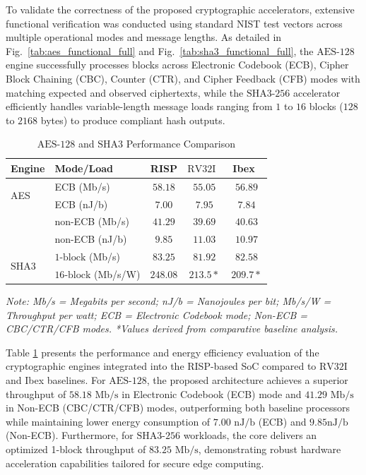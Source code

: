 To validate the correctness of the proposed cryptographic accelerators, extensive functional verification was conducted using standard NIST test vectors across multiple operational modes and message lengths. As detailed in Fig.~\ref{tab:aes_functional_full} and Fig.~\ref{tab:sha3_functional_full}, the $\text{AES}\text{-}128$ engine successfully processes blocks across Electronic Codebook (ECB), Cipher Block Chaining (CBC), Counter (CTR), and Cipher Feedback (CFB) modes with matching expected and observed ciphertexts, while the $\text{SHA}3\text{-}256$ accelerator efficiently handles variable-length message loads ranging from $1$ to $16$ blocks ($128$ to $2168$ bytes) to produce compliant hash outputs.

\begin{table}[!t]
\centering
\caption{$\text{AES}\text{-}128$ and $\text{SHA}3$ Performance Comparison}
\label{tab:crypto_perf}
\small
\begin{tabular}{l l c c c}
\toprule
\textbf{Engine} & \textbf{Mode/Load} & \textbf{RISP} & \textbf{$\text{RV}32\text{I}$~\cite{harris2021digital}} & \textbf{Ibex~\cite{gallmann2021swift}} \\
\midrule
\multirow{2}{*}{AES} & ECB (Mb/s) & $58.18$ & $55.05$ & $56.89$ \\
                     & ECB (nJ/b) & $7.00$ & $7.95$ & $7.84$ \\
                     & non-ECB (Mb/s) & $41.29$ & $39.69$ & $40.63$ \\
                     & non-ECB (nJ/b) & $9.85$ & $11.03$ & $10.97$ \\
\midrule
\multirow{2}{*}{$\text{SHA}3$} & $1\text{-}\text{block}$ (Mb/s) & $83.25$ & $81.92$ & $82.58$ \\
                       & $16\text{-}\text{block}$ (Mb/s/W) & $248.08$ & $213.5*$ & $209.7*$ \\
\bottomrule
\end{tabular}
\vspace{1pt}
\raggedright
\footnotesize\textit{Note: Mb/s = Megabits per second; nJ/b = Nanojoules per bit; Mb/s/W = Throughput per watt; ECB = Electronic Codebook mode; Non-ECB = CBC/CTR/CFB modes. *Values derived from comparative baseline analysis.}
\end{table}

Table \ref{tab:crypto_perf} presents the performance and energy efficiency evaluation of the cryptographic engines integrated into the RISP-based SoC compared to $\text{RV}32\text{I}$ and Ibex baselines. For $\text{AES}\text{-}128$, the proposed architecture achieves a superior throughput of $58.18\text{ Mb/s}$ in Electronic Codebook (ECB) mode and $41.29\text{ Mb/s}$ in Non-ECB (CBC/CTR/CFB) modes, outperforming both baseline processors while maintaining lower energy consumption of $7.00\text{ nJ/b}$ (ECB) and $9.85\text{nJ/b}$ (Non-ECB). Furthermore, for $\text{SHA}3\text{-}256$ workloads, the core delivers an optimized 1-block throughput of $83.25\text{ Mb/s}$, demonstrating robust hardware acceleration capabilities tailored for secure edge computing.

